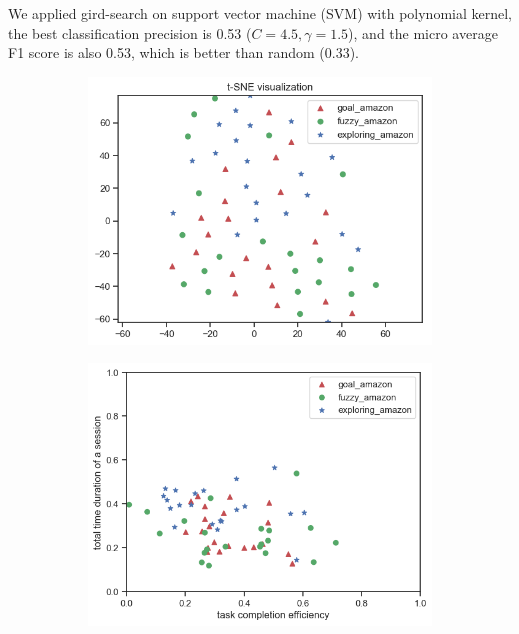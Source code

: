 We applied gird-search on support vector machine (SVM) with polynomial kernel,
the best classification precision is 0.53 ($C=4.5, \gamma = 1.5$),
and the micro average F1 score is also 0.53, which is better than random (0.33).

\begin{figure}
    \centering

    \begin{subfigure}[b]{0.45\textwidth}
        \includegraphics[width=1\textwidth]{figures/tsne-amazon}
        \caption{}
        \label{fig:tsne-amazon}
    \end{subfigure}
    \begin{subfigure}[b]{0.45\textwidth}
        \includegraphics[width=1\textwidth]{figures/2d-eff-dur-amazon}

\end{subfigure}
\end{figure}
